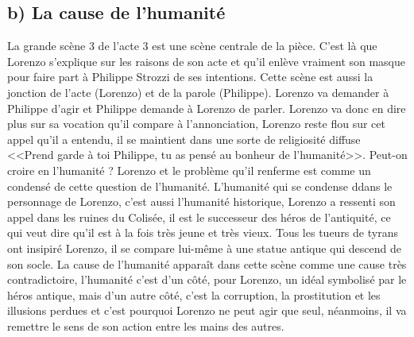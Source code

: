\documentclass[12pt]{article}
\begin{document}
\subsection*{b) La cause de l'humanité}
La grande scène 3 de l'acte 3 est une scène centrale de la pièce.
C'est là que Lorenzo s'explique sur les raisons de son acte et qu'il enlève vraiment son masque pour faire part à Philippe Strozzi de ses intentions.
Cette scène est aussi la jonction de l'acte (Lorenzo) et de la parole (Philippe). Lorenzo va demander à Philippe d'agir et Philippe demande à Lorenzo de parler.
Lorenzo va donc en dire plus sur sa vocation qu'il compare à l'annonciation, Lorenzo reste flou sur cet appel qu'il a entendu, il se maintient dans une sorte de religiosité diffuse <<Prend garde à toi Philippe, tu as pensé au bonheur de l'humanité>>.
Peut-on croire en l'humanité ? Lorenzo et le problème qu'il renferme est comme un condensé de cette question de l'humanité.
L'humanité qui se condense ddans le personnage de Lorenzo, c'est aussi l'humanité historique, Lorenzo a ressenti son appel dans les ruines du Colisée, il est le successeur des héros de l'antiquité, ce qui veut dire qu'il est à la fois très jeune et très vieux.
Tous les tueurs de tyrans ont insipiré Lorenzo, il se compare lui-même à une statue antique qui descend de son socle.
La cause de l'humanité apparaît dans cette scène comme une cause très contradictoire, l'humanité c'est d'un côté, pour Lorenzo, un idéal symbolisé par le héros antique, mais d'un autre côté, c'est la corruption, la prostitution et les illusions perdues et c'est pourquoi Lorenzo ne peut agir que seul, néanmoins, il va remettre le sens de son action entre les mains des autres.
\end{document}
